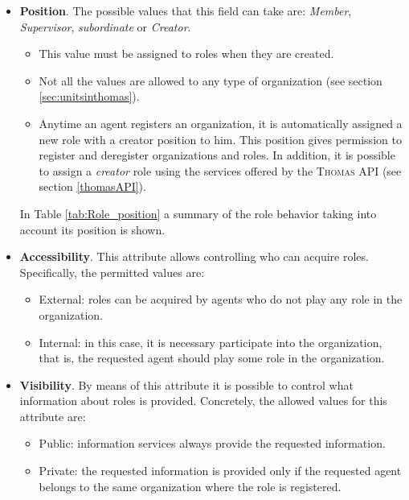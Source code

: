 \begin{itemize}
\item \textbf{Position}. The possible values that this field can take are: \textit{Member}, \textit{Supervisor}, \textit{subordinate} or \textit{Creator}.
\begin{itemize}
\item This value must be assigned to roles when they are created.
\item Not all the values are allowed to any type of organization (see section \ref{sec:unitsinthomas}).
\item Anytime an agent registers an organization, it is automatically assigned a new role with a creator position to him. This position gives permission to register and deregister organizations and roles. In addition, it is possible to assign a \textit{creator} role using the services offered by the \textsc{Thomas} API (see section \ref{thomasAPI}).
\end{itemize}

In Table \ref{tab:Role_position} a summary of the role behavior taking into account its position is shown.


\item \textbf{Accessibility}. This attribute allows controlling who can acquire roles. Specifically, the permitted values are:
\begin{itemize}
	\item External: roles can be acquired by agents who do not play any role in the organization.
	\item Internal: in this case, it is necessary participate into the organization, that is, the requested agent should play some role  in the organization.
\end{itemize}


\item \textbf{Visibility}. By means of this attribute it is possible to control what information about roles is provided. Concretely, the allowed values for this attribute are:
\begin{itemize}
\item Public: information services always provide the requested information.
\item Private: the requested information is provided only if the requested  agent belongs to the same organization where the role is registered.
\end{itemize}

\end{itemize}

